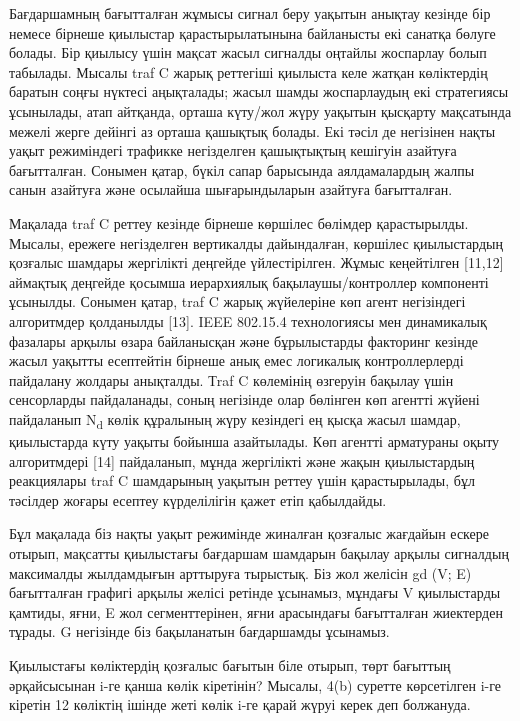 \begin{multicols}{2}
 

Бағдаршамның бағытталған жұмысы сигнал беру уақытын анықтау кезінде бір
немесе бірнеше қиылыстар қарастырылатынына байланысты екі санатқа бөлуге
болады. Бір қиылысу үшін мақсат жасыл сигналды оңтайлы жоспарлау болып
табылады. Мысалы traf C жарық реттегіші қиылыста келе жатқан көліктердің
баратын соңғы нүктесі аңықталады; жасыл шамды жоспарлаудың екі
стратегиясы ұсынылады, атап айтқанда, орташа күту/жол жүру уақытын
қысқарту мақсатында межелі жерге дейінгі аз орташа қашықтық болады. Екі
тәсіл де негізінен нақты уақыт режиміндегі трафикке негізделген
қашықтықтың кешігуін азайтуға бағытталған. Сонымен қатар, бүкіл сапар
барысында аялдамалардың жалпы санын азайтуға және осылайша
шығарындыларын азайтуға бағытталған.

Мақалада traf C реттеу кезінде бірнеше көршілес бөлімдер қарастырылды.
Мысалы, ережеге негізделген вертикалды дайындалған, көршілес
қиылыстардың қозғалыс шамдары жергілікті деңгейде үйлестірілген. Жұмыс
кеңейтілген {[}11,12{]} аймақтық деңгейде қосымша иерархиялық
бақылаушы/контроллер компоненті ұсынылды. Сонымен қатар, traf C жарық
жүйелеріне көп агент негізіндегі алгоритмдер қолданылды {[}13{]}. IEEE
802.15.4 технологиясы мен динамикалық фазалары арқылы өзара байланысқан
және бұрылыстарды факторинг кезінде жасыл уақытты есептейтін бірнеше
анық емес логикалық контроллерлерді пайдалану жолдары анықталды. Тraf C
көлемінің өзгеруін бақылау үшін сенсорларды пайдаланады, соның негізінде
олар бөлінген көп агентті жүйені пайдаланып N\textsubscript{d} көлік
құралының жүру кезіндегі ең қысқа жасыл шамдар, қиылыстарда күту уақыты
бойынша азайтылады. Көп агентті арматураны оқыту алгоритмдері {[}14{]}
пайдаланып, мұнда жергілікті және жақын қиылыстардың реакциялары traf C
шамдарының уақытын реттеу үшін қарастырылады, бұл тәсілдер жоғары
есептеу күрделілігін қажет етіп қабылдайды.

Бұл мақалада біз нақты уақыт режимінде жиналған қозғалыс жағдайын ескере
отырып, мақсатты қиылыстағы бағдаршам шамдарын бақылау арқылы сигналдың
максималды жылдамдығын арттыруға тырыстық. Біз жол желісін gd (V; E)
бағытталған графигі арқылы желісі ретінде ұсынамыз, мұндағы V
қиылыстарды қамтиды, яғни, E жол сегменттерінен, яғни арасындағы
бағытталған жиектерден тұрады. G негізінде біз бақыланатын бағдаршамды
ұсынамыз.

Қиылыстағы көліктердің қозғалыс бағытын біле отырып, төрт бағыттың
әрқайсысынан i-ге қанша көлік кіретінін? Мысалы, 4(b) суретте
көрсетілген i-ге кіретін 12 көліктің ішінде жеті көлік i-ге қарай жүруі
керек деп болжануда.
\end{multicols}


